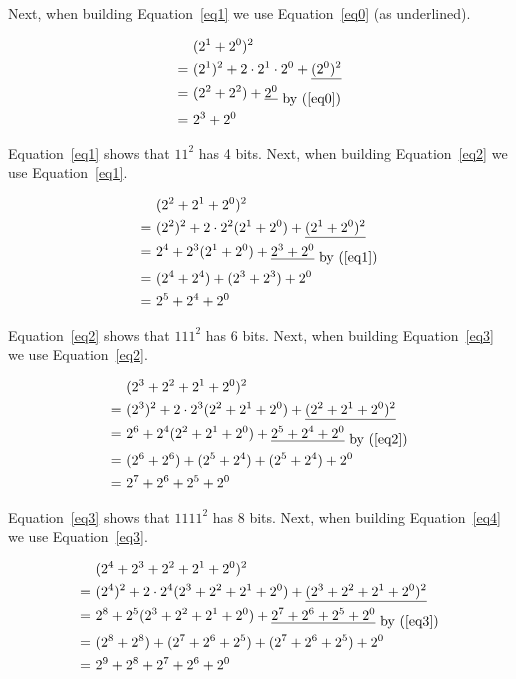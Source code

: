 \documentclass{article}
\begin{document}
 Next, when building Equation~\ref{eq1} we use Equation~\ref{eq0} (as underlined).


\begin{equation} \label{eq1}
  \begin{split}
    & (2^1+2^0)^2\\
   =\ & (2^1)^2+2\cdot2^1\cdot2^0+\underline{(2^0)^2}\\
   =\ &  (2^2+2^2)+\underline{2^0}_{\mbox{ by (\protect\ref{eq0})}}\\
   =\ &  2^3+2^0
  \end{split}
\end{equation}

Equation~\ref{eq1} shows that $11^2$ has 4 bits. Next, when building Equation~\ref{eq2} we use Equation~\ref{eq1}.

\begin{equation} \label{eq2}
  \begin{split}
    & (2^2+2^1+2^0)^2\\
   =\ & (2^2)^2+2\cdot2^2(2^1+2^0)+\underline{(2^1+2^0)^2}\\
   =\ & 2^4+2^3(2^1+2^0)+\underline{2^3+2^0}_{\mbox{ by (\protect\ref{eq1})}}\\
   =\ & (2^4+2^4)+(2^3+2^3)+2^0\\
   =\ & 2^5+2^4+2^0
  \end{split}
\end{equation}

Equation~\ref{eq2} shows that $111^2$ has 6 bits. Next, when building Equation~\ref{eq3} we use Equation~\ref{eq2}.

\begin{equation} \label{eq3}
  \begin{split}
    & (2^3+2^2+2^1+2^0)^2\\
   =\ & (2^3)^2+2\cdot2^3(2^2+2^1+2^0)+\underline{(2^2+2^1+2^0)^2}\\
   =\ & 2^6+2^4(2^2+2^1+2^0)+\underline{2^5+2^4+2^0}_{\mbox{ by (\protect\ref{eq2})}}\\
   =\ & (2^6+2^6)+(2^5+2^4)+(2^5+2^4)+2^0\\
   =\ & 2^7+2^6+2^5+2^0
  \end{split}
\end{equation}

Equation~\ref{eq3} shows that $1111^2$ has 8 bits. Next, when building Equation~\ref{eq4} we use Equation~\ref{eq3}.


\begin{equation} \label{eq4}
  \begin{split}
    & (2^4+2^3+2^2+2^1+2^0)^2\\
   =\ & (2^4)^2+2\cdot2^4(2^3+2^2+2^1+2^0)+\underline{(2^3+2^2+2^1+2^0)^2}\\
   =\ & 2^8+2^5(2^3+2^2+2^1+2^0)+\underline{2^7+2^6+2^5+2^0}_{\mbox{ by (\protect\ref{eq3})}}\\
   =\ & (2^8+2^8)+(2^7+2^6+2^5)+(2^7+2^6+2^5)+2^0\\
   =\ & 2^9+2^8+2^7+2^6+2^0
  \end{split}
\end{equation}
\end{document}
